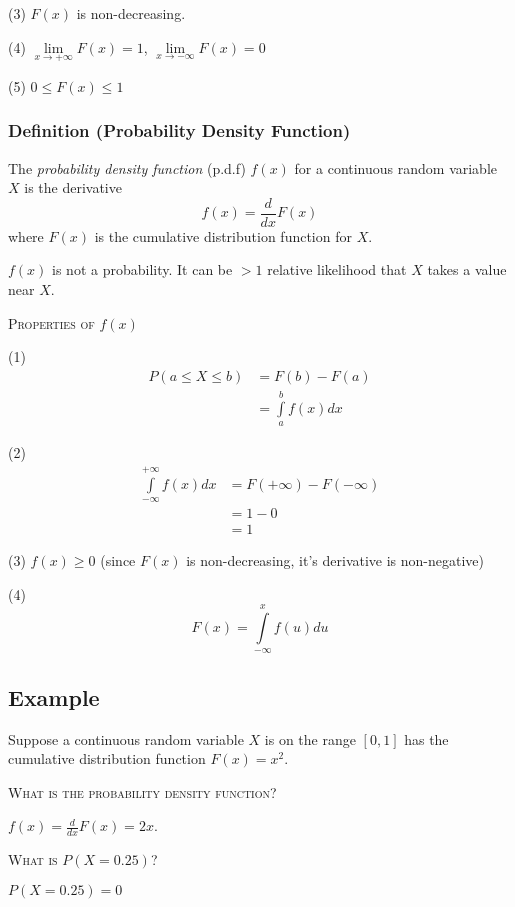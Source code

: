 (3) $ F(x) $ is non-decreasing.

(4) $ \lim\limits_{{x} \to {+\infty}} F(x)=1 $,
$ \lim\limits_{{x} \to {-\infty}} F(x)=0 $

(5) $ 0\le F(x)\le 1 $

\begin{defbox}
    \subsubsection{Definition (Probability Density Function)}
    The \emph{probability density function} (p.d.f) $ f(x) $ for a continuous
    random variable $ X $ is the derivative
    \[ f(x)=\frac{d}{dx}F(x) \]
    where $ F(x) $ is the cumulative distribution function for $ X $.
\end{defbox}

\begin{remark}
    $ f(x) $ is not a probability. It can be $ >1 $ relative
    likelihood that $ X $ takes a value near $ X $.
\end{remark}

\textsc{Properties of $ f(x) $}

(1)
\begin{align*}
    P(a\le X\le b)&=F(b)-F(a)\\
    &=\int\limits_{a}^{b} f(x) d{x}
\end{align*}

(2)
\begin{align*}
    \int\limits_{-\infty}^{+\infty} f(x) d{x}&=F(+\infty)-F(-\infty)\\
    &=1-0\\
    &=1
\end{align*}

(3) $ f(x)\ge 0 $ (since $ F(x) $ is non-decreasing, it's derivative is non-negative)

(4) \[ F(x)=\int\limits_{-\infty}^{x} f(u) d{u} \]

\subsection{Example}
Suppose a continuous random variable $ X $ is on the range $ [0,1] $ has the 
cumulative distribution function $ F(x)=x^2 $.

\textsc{What is the probability density function?}

$ f(x)=\frac{d}{dx} F(x)=2x $.

\textsc{What is $ P(X=0.25) $?}

$ P(X=0.25)=0 $

